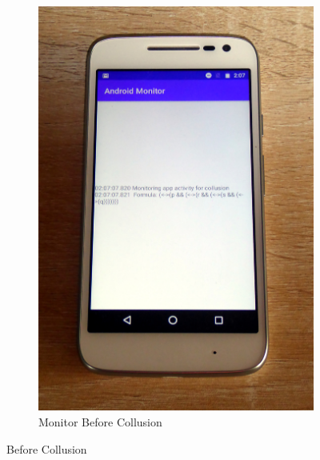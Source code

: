 \begin{figure}
\begin{subfigure}{0.49\textwidth}
		\includegraphics[height=0.45\textheight]{graphics/PhonePhotos/06 - MonitorBefore.jpg}
		\caption{Monitor Before Collusion}
		\label{fig:MonitorBefore}
	\end{subfigure}

	\caption{Before Collusion}
	\label{fig:BeforeCollusion}
\end{figure}

